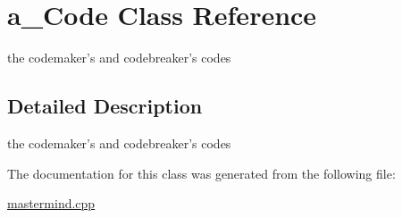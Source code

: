 \hypertarget{classa___code}{\section{a\-\_\-\-Code Class Reference}
\label{classa___code}
}


the codemaker's and codebreaker's codes  




\subsection{Detailed Description}
the codemaker's and codebreaker's codes 

The documentation for this class was generated from the following file\-:\begin{DoxyCompactItemize}
\item 
\hyperlink{mastermind_8cpp}{mastermind.\-cpp}\end{DoxyCompactItemize}
